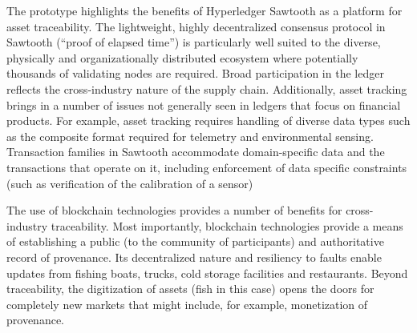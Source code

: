 The prototype highlights the benefits of Hyperledger Sawtooth as a platform for asset traceability. The lightweight, highly decentralized consensus protocol in Sawtooth (“proof of elapsed time”) is particularly well suited to the diverse, physically and organizationally distributed ecosystem where potentially thousands of validating nodes are required. Broad participation in the ledger reflects the cross-industry nature of the supply chain. Additionally, asset tracking brings in a number of issues not generally seen in ledgers that focus on financial products. For example, asset tracking requires handling of diverse data types such as the composite format required for telemetry and environmental sensing. Transaction families in Sawtooth accommodate domain-specific data and the transactions that operate on it, including enforcement of data specific constraints (such as verification of the calibration of a sensor)

The use of blockchain technologies provides a number of benefits for cross-industry traceability. Most importantly, blockchain technologies provide a means of establishing a public (to the community of participants) and authoritative record of provenance. Its decentralized nature and resiliency to faults enable updates from fishing boats, trucks, cold storage facilities and restaurants. Beyond traceability, the digitization of assets (fish in this case) opens the doors for completely new markets that might include, for example, monetization of provenance.
